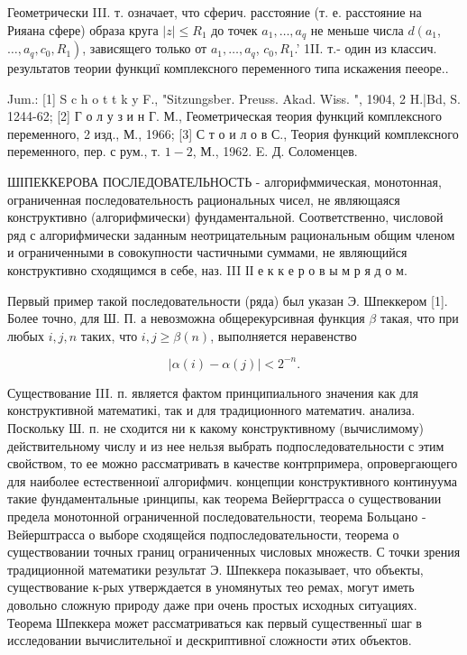 \documentclass[10pt]{article}
\begin{document}
Геометрически III. т. означает, что сферич. расстояние (т. е. расстояние на Рияана сфере) образа круга $|z| \leqslant R_{1}$ до точек $a_{1}, \ldots, a_{q}$ не меньше числа $d\left(a_{1}\right.$, $\left.\ldots, a_{q}, c_{0}, R_{1}\right)$, зависящего только от $a_{1}, \ldots, a_{q}$, $c_{0}, R_{1}$.' 1II. т.- один из классич. результатов теории функциї комплексного переменного типа искажения пееоре..



Jum.: [1] S c h o t t k y F., "Sitzungsber. Preuss. Akad. Wiss. ", 1904, 2 H.|Bd, S. 1244-62; [2] Г о л у з и н Г. М., Геометрическая теория функций комплексного переменного, 2 изд., М., 1966; [3] С т о и л о в С., Теория функций комплексного переменного, пер. с рум., т. $1-2$, М., 1962. E. Д. Соломенцев.



ШІПЕККЕРОВА ПОСЛЕДОВАТЕЛЬНОСТЬ - алгорифммическая, монотонная, ограниченная последовательность рациональных чисел, не являющаяся конструктивно (алгорифмически) фундаментальной. Соответственно, числовой ряд с алгорифмически заданным неотрицательным рациональным общим членом и ограниченными в совокупности частичными суммами, не являющийся конструктивно сходящимся в себе, наз. III ІІ е к к е р о в ы м р я д о м.



Первый пример такой последовательности (ряда) был указан Э. Шпеккером [1]. Более точно, для Ш. П. а невозможна общерекурсивная функция $\beta$ такая, что при любых $i, j, n$ таких, что $i, j \geqslant \beta(n)$, выполняется неравенство



\[

|\alpha(i)-\alpha(j)|<2^{-n} .

\]



Существование III. п. является фактом принципиального значения как для конструктивной математикі, так и для традиционного математич. анализа. Поскольку Ш. п. не сходится ни к какому конструктивному (вычислимому) действительному числу и из нее нельзя выбрать подпоследовательности с этим свойством, то ее можно рассматривать в качестве контрпримера, опровергающего для наиболее естественноиї алгорифмич. концепции конструктивного континуума такие фундаментальные ıринципы, как теорема Вейергтрасса о существовании предела монотонной ограниченной последовательности, теорема Больцано - Bейерштрасса о выборе сходящейся подпоследовательности, теорема о существовании точных границ ограниченных числовых множеств. С точки зрения традиционной математики результат Э. Шпеккера показывает, что объекты, существование к-рых утверждается в уномянутых тео ремах, могут иметь довольно сложную природу даже при очень простых исходных ситуациях. Теорема Шпеккера может рассматриваться как первый существенныї шаг в исследовании вычислительної и дескриптивної сложности әтих объектов.
\end{document}

